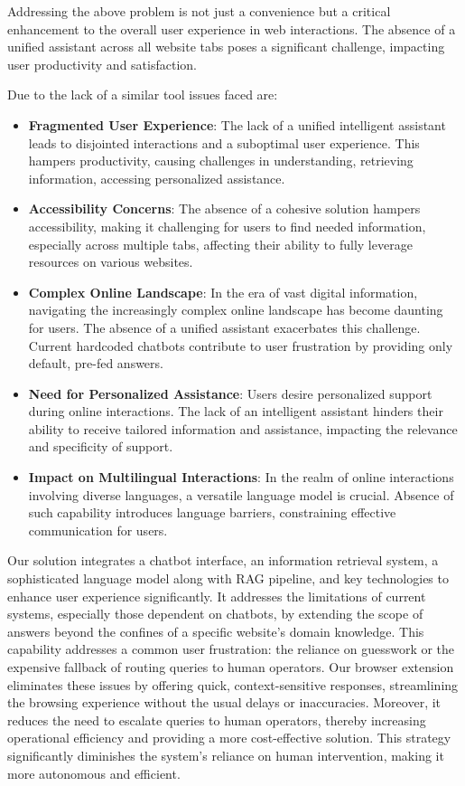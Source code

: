\documentclass[sigconf,natbib=true,anonymous=false]{acmart}
\begin{document}
Addressing the above problem is not just a convenience but a critical enhancement to the overall user experience in web interactions. The absence of a unified assistant across all website tabs poses a significant challenge, impacting user productivity and satisfaction. 

Due to the lack of a similar tool issues faced are:

\begin{itemize}
\item \textbf{Fragmented User Experience}: The lack of a unified intelligent assistant leads to disjointed interactions and a suboptimal user experience. This hampers productivity, causing challenges in understanding, retrieving information, accessing personalized assistance.
\item \textbf{Accessibility Concerns}: The absence of a cohesive solution hampers accessibility, making it challenging for users to find needed information, especially across multiple tabs, affecting their ability to fully leverage resources on various websites.
\item \textbf{Complex Online Landscape}: In the era of vast digital information, navigating the increasingly complex online landscape has become daunting for users. The absence of a unified assistant exacerbates this challenge. Current hardcoded chatbots contribute to user frustration by providing only default, pre-fed answers.
\item \textbf{Need for Personalized Assistance}: Users desire personalized support during online interactions. The lack of an intelligent assistant hinders their ability to receive tailored information and assistance, impacting the relevance and specificity of support.
\item \textbf{Impact on Multilingual Interactions}: In the realm of online interactions involving diverse languages, a versatile language model is crucial. Absence of such capability introduces language barriers, constraining effective communication for users.
\end{itemize}

Our solution integrates a chatbot interface, an information retrieval system, a sophisticated language model along with RAG pipeline, and key technologies to enhance user experience significantly. It addresses the limitations of current systems, especially those dependent on chatbots, by extending the scope of answers beyond the confines of a specific website's domain knowledge. This capability addresses a common user frustration: the reliance on guesswork or the expensive fallback of routing queries to human operators. Our browser extension eliminates these issues by offering quick, context-sensitive responses, streamlining the browsing experience without the usual delays or inaccuracies. Moreover, it reduces the need to escalate queries to human operators, thereby increasing operational efficiency and providing a more cost-effective solution. This strategy significantly diminishes the system's reliance on human intervention, making it more autonomous and efficient.
\end{document}
